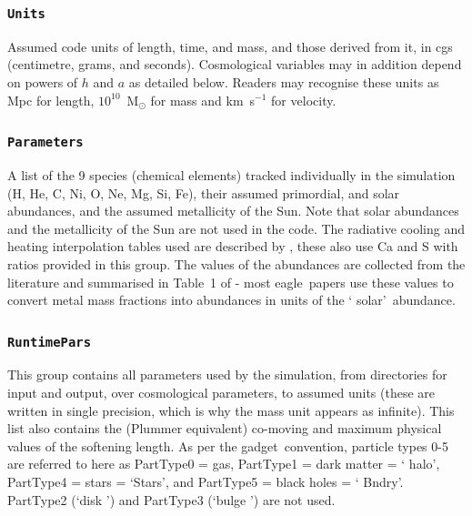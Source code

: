 \documentclass[10pt, a4paper]{article}
\newcommand{\eagle}{{\sc eagle}}
\newcommand{\gadget}{{\sc gadget}}
\begin{document}
\subsubsection{\texttt{Units}}
Assumed code units of length, time, and mass, and those derived from it, in cgs
(centimetre, grams, and seconds).  Cosmological variables may in addition
depend on powers of $h$ and $a$ as detailed below.  Readers may recognise these
units as Mpc for length, $10^{10}$~M$_\odot$ for mass and km~s$^{-1}$ for
velocity.

\subsubsection{\texttt{Parameters}} A list of the 9 species (chemical elements)
tracked individually in the simulation (H, He, C, Ni, O, Ne, Mg, Si, Fe), their
assumed primordial, and solar abundances, and the assumed metallicity of the
Sun. Note that solar abundances and the metallicity of the Sun are not used in
the code. The radiative cooling and heating interpolation tables used are
described by \cite{Wiersma09a}, these also use Ca and S with ratios provided in
this group. The values of the abundances are collected from the literature and
summarised in Table~1 of \cite{Wiersma09a} - most \eagle\ papers use these
values to convert metal mass fractions into abundances in units of the \lq
solar\rq\ abundance.

\subsubsection{\texttt{RuntimePars}}
This group contains all parameters used by the simulation, from directories for
input and output, over cosmological parameters, to assumed units (these are
written in single precision, which is why the mass unit appears as infinite).
This list also contains the (Plummer equivalent) co-moving and maximum physical
values of the softening length. As per the \gadget\ convention, particle types
0-5 are referred to here as PartType0 = gas, PartType1 = dark matter = \lq
halo\rq, PartType4 = stars = \lq Stars\rq, and PartType5 = black holes = \lq
Bndry\rq.  PartType2 (\lq disk \rq) and PartType3 (\lq bulge \rq) are not used.
\end{document}
